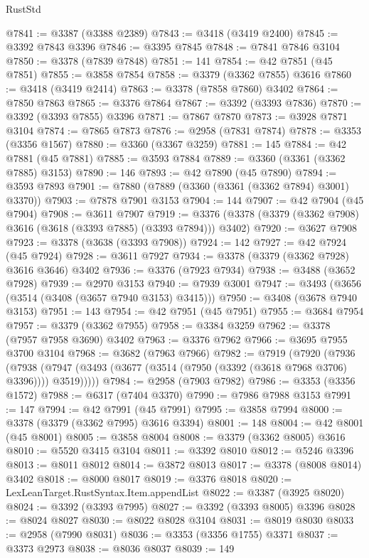 \begin{lexlean}{RustStd}
\begin{coremodule}
@7841 := @3387 (@3388 @2389)
@7843 := @3418 (@3419 @2400)
@7845 := @3392 @7843 @3396
@7846 := @3395 @7845
@7848 := @7841 @7846 @3104
@7850 := @3378 (@7839 @7848)
@7851 := 141
@7854 := @42 @7851 (@45 @7851)
@7855 := @3858 @7854
@7858 := @3379 (@3362 @7855) @3616
@7860 := @3418 (@3419 @2414)
@7863 := @3378 (@7858 @7860) @3402
@7864 := @7850 @7863
@7865 := @3376 @7864
@7867 := @3392 (@3393 @7836)
@7870 := @3392 (@3393 @7855) @3396
@7871 := @7867 @7870
@7873 := @3928 @7871 @3104
@7874 := @7865 @7873
@7876 := @2958 (@7831 @7874)
@7878 := @3353 (@3356 @1567)
@7880 := @3360 (@3367 @3259)
@7881 := 145
@7884 := @42 @7881 (@45 @7881)
@7885 := @3593 @7884
@7889 := @3360 (@3361 (@3362 @7885) @3153)
@7890 := 146
@7893 := @42 @7890 (@45 @7890)
@7894 := @3593 @7893
@7901 := @7880 (@7889 (@3360 (@3361 (@3362 @7894) @3001) @3370))
@7903 := @7878 @7901 @3153
@7904 := 144
@7907 := @42 @7904 (@45 @7904)
@7908 := @3611 @7907
@7919 := @3376 (@3378 (@3379 (@3362 @7908) @3616 (@3618 (@3393 @7885) (@3393 @7894))) @3402)
@7920 := @3627 @7908
@7923 := @3378 (@3638 (@3393 @7908))
@7924 := 142
@7927 := @42 @7924 (@45 @7924)
@7928 := @3611 @7927
@7934 := @3378 (@3379 (@3362 @7928) @3616 @3646) @3402
@7936 := @3376 (@7923 @7934)
@7938 := @3488 (@3652 @7928)
@7939 := @2970 @3153
@7940 := @7939 @3001
@7947 := @3493 (@3656 (@3514 (@3408 (@3657 @7940 @3153) @3415)))
@7950 := @3408 (@3678 @7940 @3153)
@7951 := 143
@7954 := @42 @7951 (@45 @7951)
@7955 := @3684 @7954
@7957 := @3379 (@3362 @7955)
@7958 := @3384 @3259
@7962 := @3378 (@7957 @7958 @3690) @3402
@7963 := @3376 @7962
@7966 := @3695 @7955 @3700 @3104
@7968 := @3682 (@7963 @7966)
@7982 := @7919
    (@7920
      (@7936
        (@7938 (@7947 (@3493 (@3677 (@3514 (@7950 (@3392 (@3618 @7968 @3706) @3396)))) @3519)))))
@7984 := @2958 (@7903 @7982)
@7986 := @3353 (@3356 @1572)
@7988 := @6317 (@7404 @3370)
@7990 := @7986 @7988 @3153
@7991 := 147
@7994 := @42 @7991 (@45 @7991)
@7995 := @3858 @7994
@8000 := @3378 (@3379 (@3362 @7995) @3616 @3394)
@8001 := 148
@8004 := @42 @8001 (@45 @8001)
@8005 := @3858 @8004
@8008 := @3379 (@3362 @8005) @3616
@8010 := @5520 @3415 @3104
@8011 := @3392 @8010
@8012 := @5246 @3396
@8013 := @8011 @8012
@8014 := @3872 @8013
@8017 := @3378 (@8008 @8014) @3402
@8018 := @8000 @8017
@8019 := @3376 @8018
@8020 := LexLeanTarget.RustSyntax.Item.appendList
@8022 := @3387 (@3925 @8020)
@8024 := @3392 (@3393 @7995)
@8027 := @3392 (@3393 @8005) @3396
@8028 := @8024 @8027
@8030 := @8022 @8028 @3104
@8031 := @8019 @8030
@8033 := @2958 (@7990 @8031)
@8036 := @3353 (@3356 @1755) @3371
@8037 := @3373 @2973
@8038 := @8036 @8037
@8039 := 149

\end{coremodule}
\end{lexlean}
